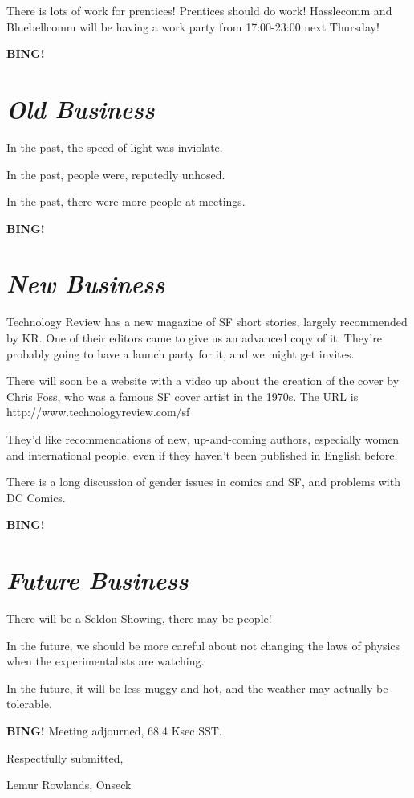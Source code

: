 \documentclass[10pt]{article}
\newcommand{\bing}{{\bf BING!} }
\newcommand{\goto}[1]{\bing \vskip 12pt \section*{{\em{#1}}}}
\newcommand{\onseck}{Lemur Rowlands, Onseck}
\begin{document}
There is lots of work for prentices!  Prentices should do work!  Hasslecomm
and Bluebellcomm will be having a work party from 17:00-23:00 next Thursday!


\goto{Old Business}

In the past, the speed of light was inviolate.

In the past, people were, reputedly unhosed. 

In the past, there were more people at meetings.

\goto{New Business}

Technology Review has a new magazine of SF short stories, largely
recommended by KR.  One of their editors came to give us an advanced
copy of it.  They're probably going to have a launch party for it, and
we might get invites.

There will soon be a website with a video up about the creation of the cover
by Chris Foss, who was a famous SF cover artist in the 1970s.  The
URL is http://www.technologyreview.com/sf

They'd like recommendations of new, up-and-coming authors, especially
women and international people, even if they haven't been published
in English before.

There is a long discussion of gender issues in comics and SF, and problems
with DC Comics.


\goto{Future Business}

There will be a Seldon Showing, there may be people!

In the future, we should be more careful about not changing the 
laws of physics when the experimentalists are watching.

In the future, it will be less muggy and hot, and the weather may
actually be tolerable.


\bing
\noindent
Meeting adjourned, 68.4 Ksec SST.

\vspace{18pt}

\centerline{Respectfully submitted,}
\centerline{\onseck}
\end{document}
